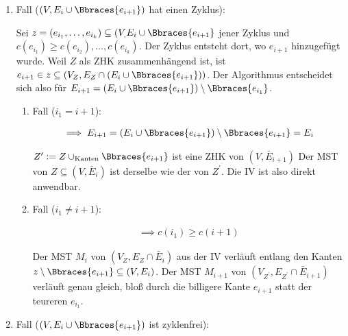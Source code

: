 \begin{solution}
\begin{enumerate}[label = (\Alph*)]
\begin{enumerate}[label = \arabic*.]
\begin{enumerate}[label = 2.\arabic*.]
            \item Fall ($(V, E_i \cup \Bbraces{e_{i+1}})$ hat einen Zyklus):
            
            Sei $z = (e_{i_1}, \dots, e_{i_k}) \subseteq (V_, E_i \cup \Bbraces{e_{i+1}}$ jener Zyklus und $c(e_{i_1}) \geq c(e_{i_2}), \dots, c(e_{i_k})$.
            Der Zyklus entsteht dort, wo $e_{i+1}$ hinzugefügt wurde.
            Weil $Z$ als ZHK zusammenhängend ist, ist $e_{i+1} \in z \subseteq (V_Z, E_Z \cap (E_i \cup \Bbraces{e_{i+1}}))$.
            Der Algorithmus entscheidet sich also für $E_{i+1} = (E_i \cup \Bbraces{e_{i+1}}) \setminus \Bbraces{e_{i_1}}$.

            \begin{enumerate}[label = 2.1.\arabic*.]

                \item Fall ($i_1 = i+1$):
                
                \begin{align*}
                    \implies
                    E_{i+1}
                    =
                    (E_i \cup \Bbraces{e_{i+1}}) \setminus \Bbraces{e_{i+1}}
                    =
                    E_i
                \end{align*}

                $Z^\prime := Z \cup_\mathrm{Kanten} \Bbraces{e_{i+1}}$ ist eine ZHK von $(V, \bar E_{i+1})$
                Der MST von $Z \subseteq (V, \bar E_i)$ ist derselbe wie der von $Z^\prime$.
                Die IV ist also direkt anwendbar.

                \item Fall ($i_1 \neq i+1$):
                
                \begin{align*}
                    \implies
                    c(i_1) \geq c(i+1)
                \end{align*}

                Der MST $M_i$ von $(V_Z, E_Z \cap \bar E_i)$ aus der IV verläuft entlang den Kanten $z \setminus \Bbraces{e_{i+1}} \subseteq (V, E_i)$.
                Der MST $M_{i+1}$ von $(V_{Z^\prime}, E_{Z^\prime} \cap \bar E_{i+1})$ verläuft genau gleich, bloß durch die billigere Kante $e_{i+1}$ statt der teureren $e_{i_1}$.

            \end{enumerate}

            \item Fall ($(V, E_i \cup \Bbraces{e_{i+1}})$ ist zyklenfrei):
            

\end{enumerate}
\end{enumerate}
\end{enumerate}
\end{solution}
